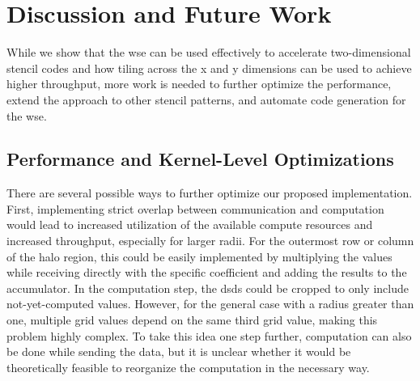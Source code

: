 \chapter{Discussion and Future Work}
While we show that the \ac{wse} can be used effectively to accelerate two-dimensional stencil codes and how tiling across the x and y dimensions can be used to achieve higher throughput, more work is needed to further optimize the performance, extend the approach to other stencil patterns, and automate code generation for the \ac{wse}.

\section{Performance and Kernel-Level Optimizations}
There are several possible ways to further optimize our proposed implementation.
First, implementing strict overlap between communication and computation would lead to increased utilization of the available compute resources and increased throughput, especially for larger radii.
For the outermost row or column of the halo region, this could be easily implemented by multiplying the values while receiving directly with the specific coefficient and adding the results to the accumulator. In the computation step, the \acp{dsd} could be cropped to only include not-yet-computed values. However, for the general case with a radius greater than one, multiple grid values depend on the same third grid value, making this problem highly complex. To take this idea one step further, computation can also be done while sending the data, but it is unclear whether it would be theoretically feasible to reorganize the computation in the necessary way.

